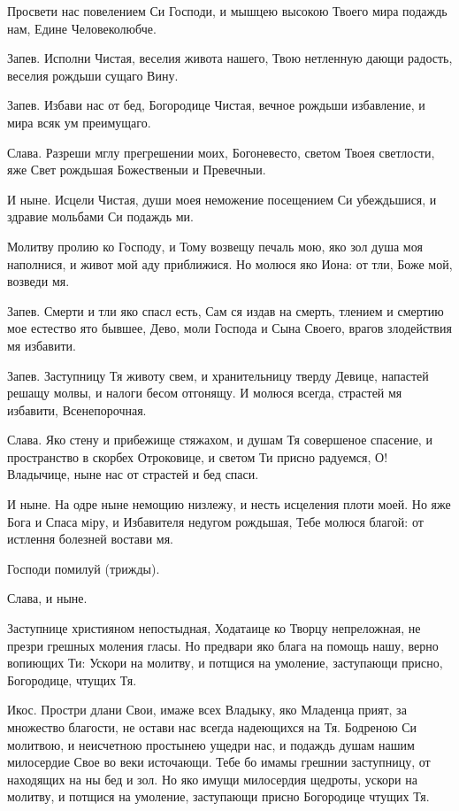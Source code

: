 Просвети нас повелением Си Господи, и мышцею высокою Твоего мира подаждь нам, Едине Человеколюбче.

Запев. Исполни Чистая, веселия живота нашего, Твою нетленную дающи радость, веселия рождьши сущаго Вину.

Запев. Избави нас от бед, Богородице Чистая, вечное рождьши избавление, и мира всяк ум преимущаго.

Слава. Разреши мглу прегрешении моих, Богоневесто, светом Твоея светлости, яже Свет рождьшая Божественыи и Превечныи.

И ныне. Исцели Чистая, души моея неможение посещением Си убеждьшися, и здравие мольбами Си подаждь ми.




Молитву пролию ко Господу, и Тому возвещу печаль мою, яко зол душа моя наполнися, и живот мой аду приближися. Но молюся яко Иона: от тли, Боже мой, возведи мя.

Запев. Смерти и тли яко спасл есть, Сам ся издав на смерть, тлением и смертию мое естество ято бывшее, Дево, моли Господа и Сына Своего, врагов злодействия мя избавити.

Запев. Заступницу Тя животу свем, и хранительницу тверду Девице, напастей решащу молвы, и налоги бесом отгонящу. И молюся всегда, страстей мя избавити, Всенепорочная.

Слава. Яко стену и прибежище стяжахом, и душам Тя совершеное спасение, и пространство в скорбех Отроковице, и светом Ти присно радуемся, О! Владычице, ныне нас от страстей и бед спаси.

И ныне. На одре ныне немощию низлежу, и несть исцеления плоти моей. Но яже Бога и Спаса мiру, и Избавителя недугом рождьшая, Тебе молюся благой: от истлення болезней востави мя.

Господи помилуй (трижды). 

Слава, и ныне.




Заступнице християном непостыдная, Ходатаице ко Творцу непреложная, не презри грешных моления гласы. Но предвари яко блага на помощь нашу, верно вопиющих Ти: Ускори на молитву, и потщися на умоление, заступающи присно, Богородице, чтущих Тя.

Икос. Простри длани Свои, имаже всех Владыку, яко Младенца прият, за множество благости, не остави нас всегда надеющихся на Тя. Бодреною Си молитвою, и неисчетною простынею ущедри нас, и подаждь душам нашим милосердие Свое во веки источающи. Тебе бо имамы грешнии заступницу, от находящих на ны бед и зол. Но яко имущи милосердия щедроты, ускори на молитву, и потщися на умоление, заступающи присно Богородице чтущих Тя.


